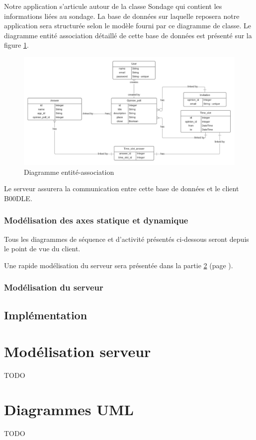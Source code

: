 \documentclass[titlepage]{report}
\begin{document}
\par Notre application s'articule autour de la classe Sondage qui contient les informations liées au sondage. 
La base de données sur laquelle reposera notre application sera structurée selon le modèle fourni par ce diagramme de classe. 
Le diagramme entité association détaillé de cette base de données est présenté sur la figure \ref{diagramme_entiteAssociation}.

\begin{figure}[h]
	\caption{Diagramme entité-association}
	\label{diagramme_entiteAssociation}
	\centering
	\includegraphics[width=\textwidth]{figures/diagrammes/entiteAssociation.png}
\end{figure}

\par Le serveur assurera la communication entre cette base de données et le client B00DLE.

\clearpage

\section{Modélisation des axes statique et dynamique}

\par Tous les diagrammes de séquence et d'activité présentés ci-dessous seront depuis le point de vue du client.
\par Une rapide modélisation du serveur sera présentée dans la partie \ref{part_shortModelServer} (page \pageref{shortModelServer}).

\section{Modélisation du serveur} 
\label{part_shortModelServer}

\chapter{Implémentation}

\part{Modélisation serveur}
\label{part_modelServer}

\par TODO

\part{Diagrammes UML}
\label{part_allUML}

\par TODO
\end{document}
